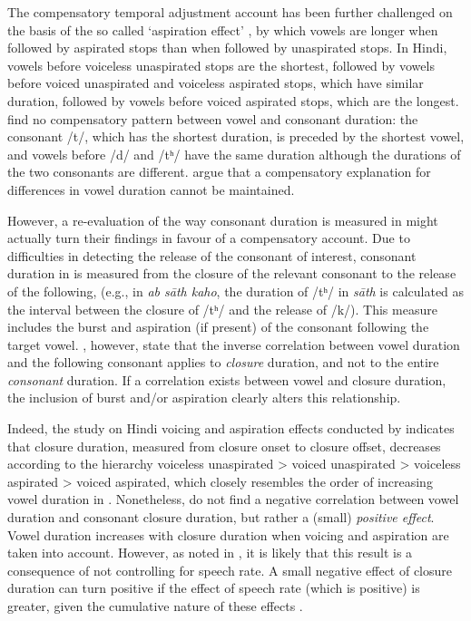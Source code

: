 \documentclass[12pt,]{article}
\begin{document}
The compensatory temporal adjustment account has been further challenged
on the basis of the so called `aspiration effect' \citep{maddieson1976},
by which vowels are longer when followed by aspirated stops than when
followed by unaspirated stops. In Hindi, vowels before voiceless
unaspirated stops are the shortest, followed by vowels before voiced
unaspirated and voiceless aspirated stops, which have similar duration,
followed by vowels before voiced aspirated stops, which are the longest.
\citet{maddieson1976} find no compensatory pattern between vowel and
consonant duration: the consonant /t/, which has the shortest duration,
is preceded by the shortest vowel, and vowels before /d/ and /tʰ/ have
the same duration although the durations of the two consonants are
different. \citet{maddieson1976} argue that a compensatory explanation
for differences in vowel duration cannot be maintained.

However, a re-evaluation of the way consonant duration is measured in
\citet{maddieson1976} might actually turn their findings in favour of a
compensatory account. Due to difficulties in detecting the release of
the consonant of interest, consonant duration in \citet{maddieson1976}
is measured from the closure of the relevant consonant to the release of
the following, (e.g., in \emph{ab sāth kaho}, the duration of /tʰ/ in
\emph{sāth} is calculated as the interval between the closure of /tʰ/
and the release of /k/). This measure includes the burst and aspiration
(if present) of the consonant following the target vowel.
\citet{slis1969a}, however, state that the inverse correlation between
vowel duration and the following consonant applies to \emph{closure}
duration, and not to the entire \emph{consonant} duration. If a
correlation exists between vowel and closure duration, the inclusion of
burst and/or aspiration clearly alters this relationship.

Indeed, the study on Hindi voicing and aspiration effects conducted by
\citet{durvasula2012} indicates that closure duration, measured from
closure onset to closure offset, decreases according to the hierarchy
voiceless unaspirated \textgreater{} voiced unaspirated \textgreater{}
voiceless aspirated \textgreater{} voiced aspirated, which closely
resembles the order of increasing vowel duration in
\citet{maddieson1976}. Nonetheless, \citet{durvasula2012} do not find a
negative correlation between vowel duration and consonant closure
duration, but rather a (small) \emph{positive effect}. Vowel duration
increases with closure duration when voicing and aspiration are taken
into account. However, as noted in \citet{begus2017}, it is likely that
this result is a consequence of not controlling for speech rate. A small
negative effect of closure duration can turn positive if the effect of
speech rate (which is positive) is greater, given the cumulative nature
of these effects \citep[p. 2177]{begus2017}.
\end{document}

